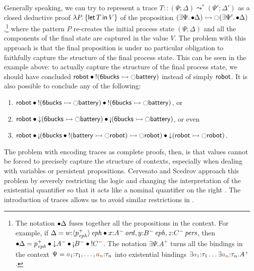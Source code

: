 Generally speaking, we can try to represent a trace $T :: (\Psi;
\Delta) \leadsto^* (\Psi'; \Delta')$ as a closed deductive proof
$\lambda P.\,\{{\sf let}\,{T}\,{\sf in}\, {V} \}$ of the proposition $(\exists
\Psi.\,{\mathbin{\bullet}}\Delta) \rightarrowtail {\ocircle}(\exists
\Psi'.\,{\mathbin{\bullet}}\Delta)$,\footnote{The notation ${\mathbin{\bullet}}{\Delta}$ fuses
  together all the propositions in the context. For example, if
  $\Delta = w{:}{\langle {p^+_{\it eph}} \rangle}\,{{\it eph}} \mathbin{\bullet} x{:}{A^-}\,{{\it ord}},
  y{:}{B^-}\,{{\it eph}}, z{:}{C^-}\,{{\it pers}}$, then ${\fuse}{\Delta} = p^+_\meph
  \fuse {\downarrow}A^- \fuse {\gnab}B^- \fuse {!}C^-$. The notation
  $\exists \Psi. A^+$ turns all the bindings in the context $\Psi =
  \lf{a_1}{:}\tau_1,\ldots,\lf{a_n}{:}\tau_n$ into existential
  bindings $\exists \lf{a_1}{:}\tau_1\ldots\exists
  \lf{a_n}{:}\tau_n.A^+$.}  where the pattern $P$ re-creates the initial
process state $(\Psi; \Delta)$ and all the components of the final
state are captured in the value $V$.  The problem with this approach
is that the final proposition is under no particular obligation to
faithfully
capture the structure of the final process state. This can be seen in
the example above: to actually capture the structure of the final
process state, we should have concluded ${\sf robot} \mathbin{\bullet} {!}({\sf
  6bucks} \rightarrowtail {\ocircle}{\sf battery})$ instead of simply ${\sf
  robot}$. It is also possible to conclude any of the following:
\smallskip
\begin{enumerate}
\item ${\sf robot} \mathbin{\bullet} {!}({\sf 6bucks} \rightarrowtail {\ocircle}{\sf
  battery}) \mathbin{\bullet} {!}({\sf 6bucks} \rightarrowtail {\ocircle}{\sf
  battery})$, or 
\item ${\sf robot} \fuse {\downarrow}({\sf 6bucks} \lefti {\ocircle}{\sf
  battery}) \fuse {\gnab}({\sf 6bucks} \lefti {\ocircle}{\sf
  battery})$, or even
\item ${\sf robot}  \fuse {\gnab}({\sf 6bucks} \fuse {!}({\sf battery} \lefti {\ocircle}{\sf robot}) \lefti {\ocircle}{\sf robot})
  \fuse {\downarrow}({\sf robot}
\lefti {\ocircle}{\sf robot})$.
\end{enumerate}
\smallskip 
%
The problem with encoding traces as complete proofs, then, is that
values cannot be forced to 
precisely capture the structure of contexts, especially when dealing
with variables or persistent propositions. Cervesato and Scedrov
approach this problem by severely restricting the logic and changing
the interpretation of the existential quantifier so that it acts like
a nominal quantifier on the right \cite{cervesato09relating}. The
introduction of traces allows us to avoid similar restrictions in
\sls.

